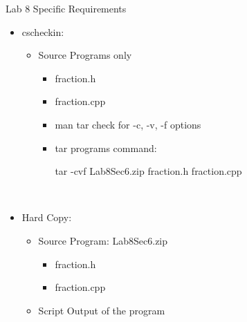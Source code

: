 \documentclass[presentation]{beamer}
\begin{document}
\begin{frame}[label=sec-10]{Lab 8 Specific Requirements}
\begin{itemize}
\item \alert{cscheckin}:
\begin{itemize}
\item \alert{Source Programs} only
\begin{itemize}
\item \alert{fraction.h}
\item \alert{fraction.cpp}
\item \alert{man tar} check for \alert{-c}, \alert{-v}, \alert{-f} options
\item \alert{tar} programs command:

\alert{tar -cvf Lab8Sec6.zip fraction.h fraction.cpp}
\end{itemize}
\end{itemize}
\end{itemize}
\\
\begin{itemize}
\item \alert{Hard Copy}:
\begin{itemize}
\item \alert{Source Program}: \alert{Lab8Sec6.zip}
\begin{itemize}
\item fraction.h
\item fraction.cpp
\end{itemize}
\item \alert{Script Output} of the program
\end{itemize}
\end{itemize}
\end{frame}
\end{document}
